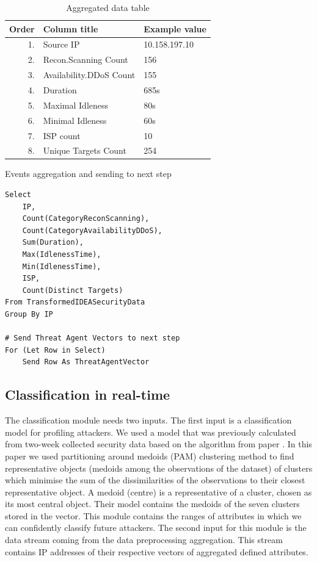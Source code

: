 \documentclass[conference, a4paper]{IEEEtran}
\begin{document}
\begin{table}[h!]
\caption{Aggregated data table}
\label{tab:aggregateddata}
\centering
\begin{tabular}{|r|l||l|}
\hline
\textbf{Order} & \textbf{Column title} & \textbf{Example value} \\ \hline \hline
1. & Source IP & 10.158.197.10 \\ \hline
2. & Recon.Scanning Count & 156 \\ \hline
3. & Availability.DDoS Count & 155 \\ \hline
4. & Duration & 685s \\ \hline
5. & Maximal Idleness & 80s \\ \hline
6. & Minimal Idleness & 60s \\ \hline
7. & ISP count & 10 \\ \hline
8. & Unique Targets Count & 254 \\ \hline
\end{tabular}
\end{table}

\begin{algorithm}
\caption{Events aggregation and sending to next step}
\label{alg1} %
\begin{lstlisting}
Select 
    IP, 
    Count(CategoryReconScanning),
    Count(CategoryAvailabilityDDoS), 
    Sum(Duration), 
    Max(IdlenessTime), 
    Min(IdlenessTime), 
    ISP, 
    Count(Distinct Targets) 
From TransformedIDEASecurityData 
Group By IP 

# Send Threat Agent Vectors to next step
For (Let Row in Select)  
    Send Row As ThreatAgentVector 
\end{lstlisting}
\end{algorithm}

\subsection{Classification in real-time}
The classification module needs two inputs. The first input is a classification model for profiling attackers. We used a model that was previously calculated from two-week collected security data based on the algorithm from paper \cite{bajtovs2018network}. In this paper we used partitioning around medoids (PAM) clustering method \cite{tuffery2011data} to find representative objects (medoids among the observations of the dataset) of clusters which minimise the sum of the dissimilarities of the observations to their closest representative object. A medoid (centre) is a representative of a cluster, chosen as its most central object. Their model contains the medoids of the seven clusters stored in the vector. This module contains the ranges of attributes in which we can confidently classify future attackers. The second input for this module is the data stream coming from the data preprocessing aggregation. This stream contains IP addresses of their respective vectors of aggregated defined attributes. 
\end{document}
